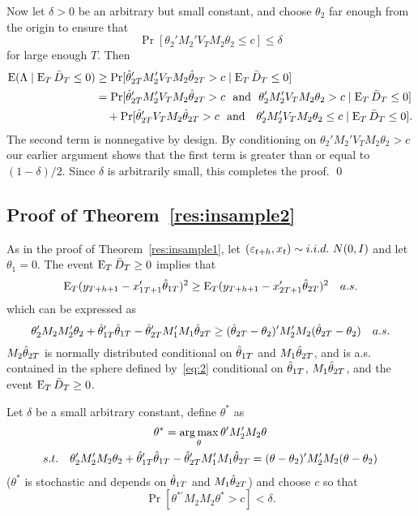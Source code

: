 \documentclass[12pt,draft]{article}
\begin{document}
Now let $\delta > 0$ be an arbitrary but small constant, and choose
$\theta_2$ far enough from the origin to ensure that
\begin{equation*}
  \Pr[\theta_2'M_2' V_T M_2 \theta_2 \leq c] \leq \delta
\end{equation*}
for large enough $T$. Then
\begin{align*}
  \operatorname{E}(\Lambda \mid \operatorname{E}_T \bar{D}_{T} \leq 0) &
  \geq \Pr[\hat\theta_{2T}' M_2' V_T M_2 \hat\theta_{2T} > c \mid \operatorname{E}_T \bar{D}_{T} \leq 0] \\
  &= \Pr[\hat\theta_{2T}' M_2' V_T M_2 \hat\theta_{2T} > c \text{~~and~~}
  \theta_2'M_2' V_T M_2 \theta_2 > c \mid \operatorname{E}_T \bar{D}_{T}  \leq 0] \\
  & \quad + \Pr[\hat\theta_{2T}' V_T M_2 \hat\theta_{2T} > c \text{~~and~~ }
  \theta_2'M_2' V_T M_2 \theta_2 \leq c \mid \operatorname{E}_T \bar{D}_{T} \leq 0].
\end{align*}
The second term is nonnegative by design. By conditioning on
$\theta_2'M_2' V_T M_2 \theta_2 > c$ our earlier argument shows that
the first term is greater than or equal to $(1 - \delta) / 2$. Since
$\delta$ is arbitrarily small, this completes the proof.
\qed

\subsection*{Proof of Theorem~\ref{res:insample2}}
As in the proof of Theorem~\ref{res:insample1}, let $(\varepsilon_{t+h}, x_{t})
\sim i.i.d.\ N(0,I)$ and let $\theta_1 = 0$. The event $\operatorname{E}_T \bar{D}_{T}
\geq 0$ implies that
\begin{equation*}
  \operatorname{E}_T (y_{T+h+1} - x_{1T+1}'\hat\theta_{1T})^2
  \geq \operatorname{E}_T (y_{T+h+1} - x_{2T+1}'\hat\theta_{2T})^2 \quad a.s.
\end{equation*}
which can be expressed as
\begin{equation}\label{eq:2}
  \theta_2'M_2 M_2'\theta_2 + \hat\theta_{1T}'\hat\theta_{1T} - \hat\theta_{2T}'M_1'M_1\hat\theta_{2T}
  \geq (\hat\theta_{2T} - \theta_2)' M_2'M_2 (\hat\theta_{2T} - \theta_2) \quad a.s.
\end{equation}
$M_2 \hat\theta_{2T}$ is normally distributed conditional on $\hat\theta_{1T}$ and
$M_1 \hat\theta_{2T}$, and is a.s. contained in the sphere defined
by~\eqref{eq:2} conditional on $\hat\theta_{1T}$, $M_1 \hat\theta_{2T}$, and the
event $\operatorname{E}_T \bar{D}_{T} \geq 0$.

Let $\delta$ be a small arbitrary constant, define $\theta^*$ as
\begin{gather*}
  \theta^* = \operatorname*{arg\,max}_\theta \theta' M_2' M_2 \theta \\
  s.t.\quad \theta_2'M_2'M_2\theta_2 +  \hat\theta_{1T}'\hat\theta_{1T} - \hat\theta_{2T}'M_1'M_1\hat\theta_{2T} = (\theta - \theta_2)' M_2'M_2 (\theta - \theta_2)
\end{gather*}
($\theta^*$ is stochastic and depends on $\hat\theta_{1T}$ and $M_1 \hat\theta_{2T}$)
and choose $c$ so that
\begin{equation*}
  \Pr[ \theta^{* \prime} M_2 M_2 \theta^* > c] < \delta.
\end{equation*}
\end{document}
